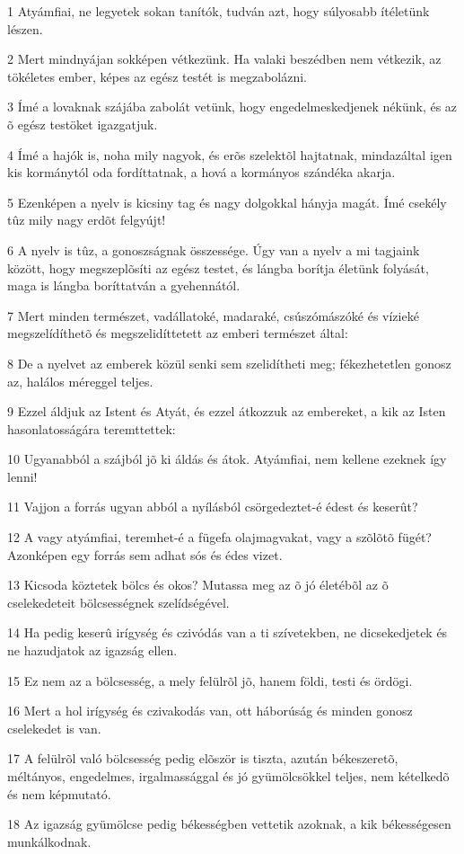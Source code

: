 \par 1 Atyámfiai, ne legyetek sokan tanítók, tudván azt, hogy súlyosabb ítéletünk lészen.
\par 2 Mert mindnyájan sokképen vétkezünk. Ha valaki beszédben nem vétkezik, az tökéletes ember, képes az egész testét is megzabolázni.
\par 3 Ímé a lovaknak szájába zabolát vetünk, hogy engedelmeskedjenek nékünk, és az õ egész testöket igazgatjuk.
\par 4 Ímé a hajók is, noha mily nagyok, és erõs szelektõl hajtatnak, mindazáltal igen kis kormánytól oda fordíttatnak, a hová a kormányos szándéka akarja.
\par 5 Ezenképen a nyelv is kicsiny tag és nagy dolgokkal hányja magát. Ímé csekély tûz mily nagy erdõt felgyújt!
\par 6 A nyelv is tûz, a gonoszságnak összessége. Úgy van a nyelv a mi tagjaink között, hogy megszeplõsíti az egész testet, és lángba borítja életünk folyását, maga is lángba boríttatván a gyehennától.
\par 7 Mert minden természet, vadállatoké, madaraké, csúszómászóké és vízieké megszelídíthetõ és megszelidíttetett az emberi természet által:
\par 8 De a nyelvet az emberek közül senki sem szelidítheti meg; fékezhetetlen gonosz az, halálos méreggel teljes.
\par 9 Ezzel áldjuk az Istent és Atyát, és ezzel átkozzuk az embereket, a kik az Isten hasonlatosságára  teremttettek:
\par 10 Ugyanabból a szájból jõ ki áldás és átok. Atyámfiai, nem kellene ezeknek így lenni!
\par 11 Vajjon a forrás ugyan abból a nyílásból csörgedeztet-é édest és keserût?
\par 12 A vagy atyámfiai, teremhet-é a fügefa olajmagvakat, vagy a szõlõtõ fügét? Azonképen egy forrás sem adhat sós és édes vizet.
\par 13 Kicsoda köztetek bölcs és okos? Mutassa meg az õ jó életébõl az õ cselekedeteit bölcsességnek szelídségével.
\par 14 Ha pedig keserû irígység és czivódás van a ti szívetekben, ne dicsekedjetek és ne hazudjatok az igazság ellen.
\par 15 Ez nem az a bölcsesség, a mely felülrõl jõ, hanem földi, testi és ördögi.
\par 16 Mert a hol irígység és czivakodás van, ott háborúság és minden gonosz cselekedet is van.
\par 17 A felülrõl való bölcsesség pedig elõször is tiszta, azután békeszeretõ, méltányos, engedelmes, irgalmassággal és jó gyümölcsökkel teljes, nem kételkedõ és nem képmutató.
\par 18 Az igazság gyümölcse pedig békességben vettetik azoknak, a  kik békességesen munkálkodnak.

